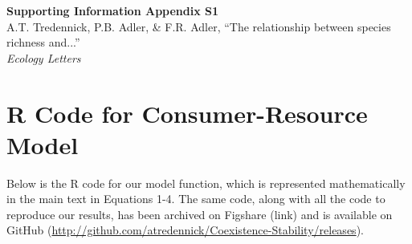 \documentclass[11pt,]{article}
\title{}
\author{}
\date{}
\begin{document}
\newcommand{\tikzcircle}[2][red,fill=red]{\tikz[baseline=-0.5ex]\draw[#1,radius=#2] (0,0) circle ;}
\renewcommand\linenumberfont{\normalfont\tiny\sffamily\color{gray}}
\renewcommand\thefigure{S1-\arabic{figure}}  
\renewcommand\thetable{S1-\arabic{table}}  
\renewcommand\thesection{Section S1.\arabic{section}}

\begin{center}
\textbf{\Large{Supporting Information Appendix S1}} \\
A.T. Tredennick, P.B. Adler, \& F.R. Adler, ``The relationship between species richness and...'' \\
\emph{Ecology Letters}
\end{center}

\section{R Code for Consumer-Resource Model}

Below is the R code for our model function, which is represented
mathematically in the main text in Equations 1-4. The same code, along
with all the code to reproduce our results, has been archived on
Figshare (link) and is available on GitHub
(\url{http://github.com/atredennick/Coexistence-Stability/releases}).
\end{document}
